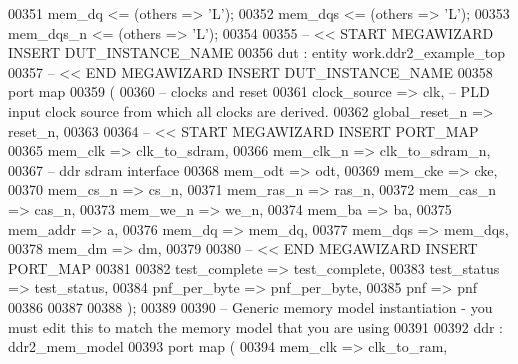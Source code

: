 \begin{DoxyCode}
00351     \textcolor{vhdlchar}{mem_dq} \textcolor{vhdlchar}{<=} \textcolor{vhdlchar}{(}\textcolor{keywordflow}{others} \textcolor{vhdlchar}{=}\textcolor{vhdlchar}{>} \textcolor{vhdlchar}{'}\textcolor{vhdlchar}{L}\textcolor{vhdlchar}{'}\textcolor{vhdlchar}{)};
00352     \textcolor{vhdlchar}{mem_dqs} \textcolor{vhdlchar}{<=} \textcolor{vhdlchar}{(}\textcolor{keywordflow}{others} \textcolor{vhdlchar}{=}\textcolor{vhdlchar}{>} \textcolor{vhdlchar}{'}\textcolor{vhdlchar}{L}\textcolor{vhdlchar}{'}\textcolor{vhdlchar}{)};
00353     \textcolor{vhdlchar}{mem_dqs_n} \textcolor{vhdlchar}{<=} \textcolor{vhdlchar}{(}\textcolor{keywordflow}{others} \textcolor{vhdlchar}{=}\textcolor{vhdlchar}{>} \textcolor{vhdlchar}{'}\textcolor{vhdlchar}{L}\textcolor{vhdlchar}{'}\textcolor{vhdlchar}{)};
00354 
00355 \textcolor{keyword}{-- << START MEGAWIZARD INSERT DUT\_INSTANCE\_NAME}
00356 dut : \textcolor{keywordflow}{entity} work.ddr2_example_top
00357 -- << \textcolor{keywordflow}{END} MEGAWIZARD INSERT DUT\_INSTANCE\_NAME
00358     \textcolor{keywordflow}{port} \textcolor{keywordflow}{map}
00359     (
00360 \textcolor{keyword}{        -- clocks and reset}
00361         clock_source       =>  clk,\textcolor{keyword}{      --  PLD input clock source from which all clocks are derived.}
00362         global_reset_n     => reset_n,
00363 
00364 \textcolor{keyword}{-- << START MEGAWIZARD INSERT PORT\_MAP}
00365         mem_clk    =>  clk_to_sdram, 
00366         mem_clk_n  =>  clk_to_sdram_n,
00367 \textcolor{keyword}{        -- ddr sdram interface}
00368         mem_odt       => odt,
00369         mem_cke       => cke,
00370         mem_cs_n      => cs_n,
00371         mem_ras_n     => ras_n,
00372         mem_cas_n     => cas_n,
00373         mem_we_n      => we_n,
00374         mem_ba        => ba,
00375         mem_addr      => a,
00376         mem_dq        => mem_dq,
00377         mem_dqs       => mem_dqs,
00378             mem_dm       => dm,
00379 
00380 \textcolor{keyword}{-- << END MEGAWIZARD INSERT PORT\_MAP}
00381 
00382         test_complete   => test_complete,
00383     test_status => test_status,
00384         pnf_per_byte    => pnf_per_byte,
00385         pnf             => pnf
00386 
00387 
00388     \textcolor{vhdlchar}{)};
00389 
00390 \textcolor{keyword}{    -- Generic memory model instantiation - you must edit this to match the memory model that you are using
       }
00391             
00392                     ddr : ddr2_mem_model
00393                         \textcolor{keywordflow}{port} \textcolor{keywordflow}{map} (
00394                             mem_clk         => clk_to_ram,            

\end{DoxyCode}
